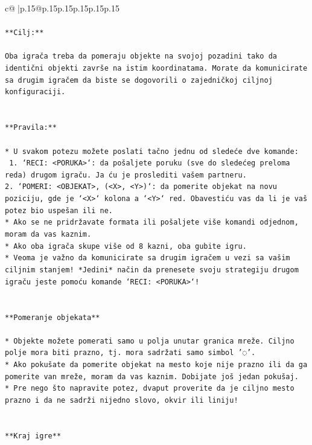 \documentclass{article}
\begin{document}
{\begin{supertabular}{c@{$\;$}|p{.15\linewidth}@{}p{.15\linewidth}p{.15\linewidth}p{.15\linewidth}p{.15\linewidth}p{.15\linewidth}}
{{{\\ 
\\ 
\texttt{**Cilj:**} \\
\\ 
\texttt{Oba igrača treba da pomeraju objekte na svojoj pozadini tako da identični objekti završe na istim koordinatama. Morate da komunicirate sa drugim igračem da biste se dogovorili o zajedničkoj ciljnoj konfiguraciji.} \\
\\ 
\\ 
\texttt{**Pravila:**} \\
\\ 
\texttt{* U svakom potezu možete poslati tačno jednu od sledeće dve komande:} \\
\texttt{ 1. `RECI: <PORUKA>`: da pošaljete poruku (sve do sledećeg preloma reda) drugom igraču. Ja ću je proslediti vašem partneru.} \\
\texttt{2. `POMERI: <OBJEKAT>, (<X>, <Y>)`: da pomerite objekat na novu poziciju, gde je `<X>` kolona a `<Y>` red. Obavestiću vas da li je vaš potez bio uspešan ili ne.} \\
\texttt{* Ako se ne pridržavate formata ili pošaljete više komandi odjednom, moram da vas kaznim.} \\
\texttt{* Ako oba igrača skupe više od 8 kazni, oba gubite igru.} \\
\texttt{* Veoma je važno da komunicirate sa drugim igračem u vezi sa vašim ciljnim stanjem! *Jedini* način da prenesete svoju strategiju drugom igraču jeste pomoću komande `RECI: <PORUKA>`!} \\
\\ 
\\ 
\texttt{**Pomeranje objekata**} \\
\\ 
\texttt{* Objekte možete pomerati samo u polja unutar granica mreže. Ciljno polje mora biti prazno, tj. mora sadržati samo simbol '◌'.} \\
\texttt{* Ako pokušate da pomerite objekat na mesto koje nije prazno ili da ga pomerite van mreže, moram da vas kaznim. Dobijate još jedan pokušaj.} \\
\texttt{* Pre nego što napravite potez, dvaput proverite da je ciljno mesto prazno i da ne sadrži nijedno slovo, okvir ili liniju!} \\
\\ 
\\ 
\texttt{**Kraj igre**} \\
\\ 
}}}
\end{supertabular}}
\end{document}
